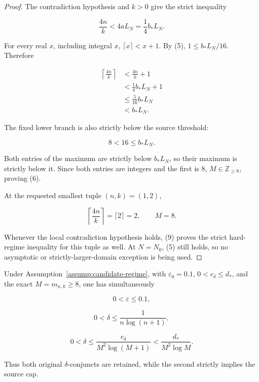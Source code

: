 \begin{proof}
The contradiction hypothesis and \(k>0\) give the strict inequality

\[
\frac{4n}{k}
<4aL_N
=\frac14 b_*L_N.
\tag{7}
\]

For every real \(x\), including integral \(x\),
\(\lceil x\rceil<x+1\). By (5), \(1\le b_*L_N/16\). Therefore

\[
\begin{aligned}
\left\lceil\frac{4n}{k}\right\rceil
&<\frac{4n}{k}+1\\
&<\frac14b_*L_N+1\\
&\le\frac{5}{16}b_*L_N\\
&<b_*L_N.
\end{aligned}
\tag{8}
\]

The fixed lower branch is also strictly below the source threshold:

\[
8<16\le b_*L_N.
\tag{9}
\]

Both entries of the maximum are strictly below \(b_*L_N\), so their
maximum is strictly below it. Since both entries are integers and the first
is 8, \(M\in\mathbb Z_{\ge8}\), proving (6).

At the requested smallest tuple \((n,k)=(1,2)\),

\[
\left\lceil\frac{4n}{k}\right\rceil=\lceil2\rceil=2,
\qquad M=8.
\]

Whenever the local contradiction hypothesis holds, (9) proves the strict
hard-regime inequality for this tuple as well. At \(N=N_0\), (5) still
holds, so no asymptotic or strictly-larger-domain exception is being used.
\end{proof}

\begin{lemma}\label{lem:step-005-privacy-cap}
Under Assumption~\ref{assump:candidate-regime}, with
\(\varepsilon_0=0.1\), \(0<c_\delta\le d_*\), and the exact
\(M=m_{n,k}\ge8\), one has simultaneously

\[
0<\varepsilon\le0.1,
\tag{10}
\]

\[
0<\delta\le\frac{1}{n\log(n+1)},
\tag{11}
\]

\[
0<\delta\le\frac{c_\delta}{M^2\log(M+1)}
<\frac{d_*}{M^2\log M}.
\tag{12}
\]

Thus both original \(\delta\)-conjuncts are retained, while the second
strictly implies the source cap.
\end{lemma}

